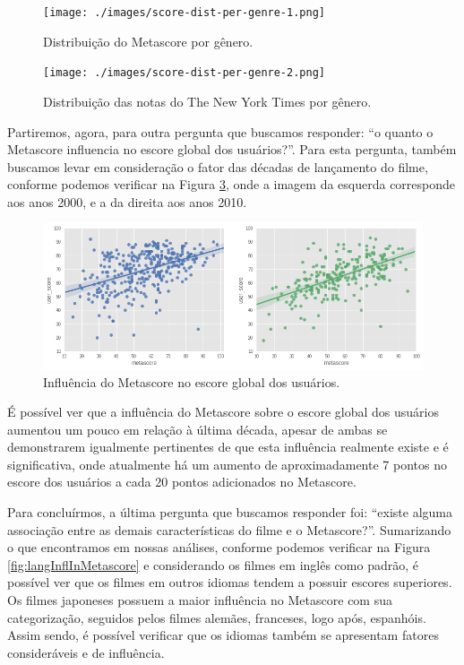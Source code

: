 \documentclass[review]{elsarticle}
\begin{document}
\begin{figure}[!h]
  \centering
  \texttt{[image: ./images/score-dist-per-genre-1.png]}
  \caption{Distribuição do Metascore por gênero.}
  \label{fig:metascoreDistPerGenreOne}
\end{figure}

\begin{figure}[!h]
  \centering
  \texttt{[image: ./images/score-dist-per-genre-2.png]}
  \caption{Distribuição das notas do The New York Times por gênero.}
  \label{fig:metascoreDistPerGenreTwo}
\end{figure}

Partiremos, agora, para outra pergunta que buscamos responder: “o quanto o Metascore influencia no escore global dos usuários?”. Para esta pergunta, também buscamos levar em consideração o fator das décadas de lançamento do filme, conforme podemos verificar na Figura \ref{fig:metaInflInUser}, onde a imagem da esquerda corresponde aos anos 2000, e a da direita aos anos 2010.

\begin{figure}[!h]
  \centering
  \includegraphics[width=\linewidth]{../observations/metascore-infl-comparison.png}
  \caption{Influência do Metascore no escore global dos usuários.}
  \label{fig:metaInflInUser}
\end{figure}

É possível ver que a influência do Metascore sobre o escore global dos usuários aumentou um pouco em relação à última década, apesar de ambas se demonstrarem igualmente pertinentes de que esta influência realmente existe e é significativa, onde atualmente há um aumento de aproximadamente 7 pontos no escore dos usuários a cada 20 pontos adicionados no Metascore.

Para concluírmos, a última pergunta que buscamos responder foi: “existe alguma associação entre as demais características do filme e o Metascore?”. Sumarizando o que encontramos em nossas análises, conforme podemos verificar na Figura \ref{fig:langInflInMetascore} e considerando os filmes em inglês como padrão, é possível ver que os filmes em outros idiomas tendem a possuir escores superiores. Os filmes japoneses possuem a maior influência no Metascore com sua categorização, seguidos pelos filmes alemães, franceses, logo após, espanhóis. Assim sendo, é possível verificar que os idiomas também se apresentam fatores consideráveis e de influência.
\end{document}
